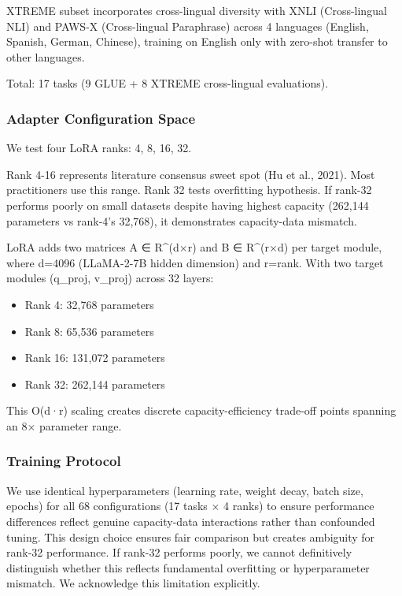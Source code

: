 XTREME subset incorporates cross-lingual diversity with XNLI (Cross-lingual NLI) and PAWS-X (Cross-lingual Paraphrase) across 4 languages (English, Spanish, German, Chinese), training on English only with zero-shot transfer to other languages.

Total: 17 tasks (9 GLUE + 8 XTREME cross-lingual evaluations).

\subsubsection{Adapter Configuration Space}

We test four LoRA ranks: {4, 8, 16, 32}.

Rank 4-16 represents literature consensus sweet spot (Hu et al., 2021). Most practitioners use this range. Rank 32 tests overfitting hypothesis. If rank-32 performs poorly on small datasets despite having highest capacity (262,144 parameters vs rank-4's 32,768), it demonstrates capacity-data mismatch.

LoRA adds two matrices A ∈ R^(d×r) and B ∈ R^(r×d) per target module, where d=4096 (LLaMA-2-7B hidden dimension) and r=rank. With two target modules (q_proj, v_proj) across 32 layers:

\begin{itemize}
\item Rank 4: 32,768 parameters
\item Rank 8: 65,536 parameters
\item Rank 16: 131,072 parameters
\item Rank 32: 262,144 parameters
\end{itemize}

This O(d·r) scaling creates discrete capacity-efficiency trade-off points spanning an 8× parameter range.

\subsubsection{Training Protocol}

We use identical hyperparameters (learning rate, weight decay, batch size, epochs) for all 68 configurations (17 tasks × 4 ranks) to ensure performance differences reflect genuine capacity-data interactions rather than confounded tuning. This design choice ensures fair comparison but creates ambiguity for rank-32 performance. If rank-32 performs poorly, we cannot definitively distinguish whether this reflects fundamental overfitting or hyperparameter mismatch. We acknowledge this limitation explicitly.

